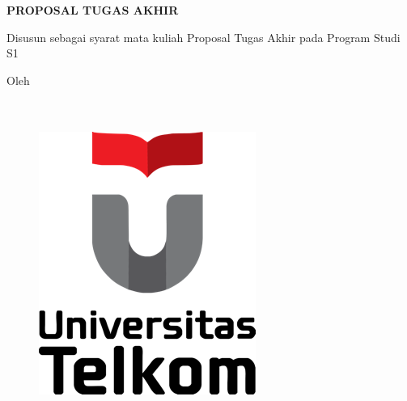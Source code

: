 
\begin{titlepage}
    \begin{center}      
        \bo{\Judul} \\[0.75cm]
        
        \textit{\bo{\JudulInggris}} \\[1.0cm]

        \vspace*{0.1 cm}    
        \textbf{PROPOSAL TUGAS AKHIR}
        
        \vspace*{.2 cm}
        
		Disusun sebagai syarat mata kuliah Proposal Tugas Akhir
		pada Program Studi S1  \program

        \vspace*{.4 cm}       
        Oleh\\
        \bo{\Penulis} \\
        \bo{\nim} \\

        \vspace*{.5 cm}

        \begin{figure}
            \begin{center}
                \includegraphics[width=0.3\linewidth]{pics/Untel.png}
            \end{center}
        \end{figure}
        \vspace*{0.25cm}
       
    \end{center}
\end{titlepage}
